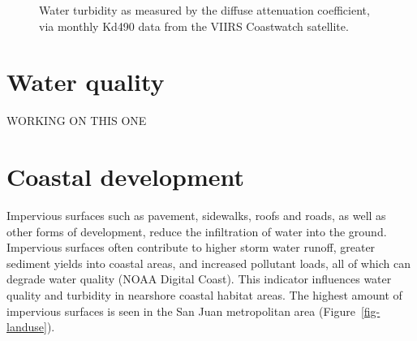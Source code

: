 \documentclass[
  letterpaper,
  oneside,
  open=any]{scrbook}
\begin{document}
\begin{figure}


\caption{\label{fig-turb}Water turbidity as measured by the diffuse
attenuation coefficient, via monthly Kd490 data from the VIIRS
Coastwatch satellite.}

\end{figure}%

\section{Water quality}\label{water-quality}

WORKING ON THIS ONE

\section{Coastal development}\label{coastal-development}

Impervious surfaces such as pavement, sidewalks, roofs and roads, as
well as other forms of development, reduce the infiltration of water
into the ground. Impervious surfaces often contribute to higher storm
water runoff, greater sediment yields into coastal areas, and increased
pollutant loads, all of which can degrade water quality (NOAA Digital
Coast). This indicator influences water quality and turbidity in
nearshore coastal habitat areas. The highest amount of impervious
surfaces is seen in the San Juan metropolitan area
(Figure~\ref{fig-landuse}).
\end{document}
